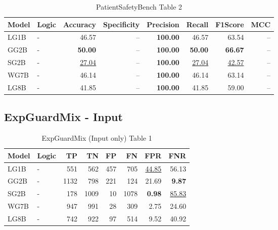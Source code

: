 \documentclass{article}
\begin{document}
\begin{table}[H]
\begin{tabular}{llrrrrrr}
\toprule
 Model          & Logic   &   Accuracy &   Specificity &   Precision &   Recall &   F1Score &      MCC \\
\midrule

 LG1B    & -       & 46.57             & --            & \textbf{100.00} & 46.57             & 63.54             & --    \\
 GG2B    & -       & \textbf{50.00}    & --            & \textbf{100.00} & \textbf{50.00}    & \textbf{66.67}    & --    \\
 SG2B    & -       & \underline{27.04} & --            & \textbf{100.00} & \underline{27.04} & \underline{42.57} & --    \\
 WG7B    & -       & 46.14             & --            & \textbf{100.00} & 46.14             & 63.14             & --    \\
 LG8B    & -       & 41.85             & --            & \textbf{100.00} & 41.85             & 59.00             & --    \\

\bottomrule
\end{tabular}
\caption{\label{tab:xstest2}PatientSafetyBench Table 2}
\end{table}

\subsection{ExpGuardMix - Input}

\begin{table}[H]
\centering
\begin{tabular}{llrrrrrr}
\toprule
 Model          & Logic   &   TP &   TN &   FP &   FN &   FPR &   FNR \\
\midrule

 LG1B    & -       &  551 &  562 &  457 &  705 & \underline{44.85} & 56.13             \\
 GG2B    & -       & 1132 &  798 &  221 &  124 & 21.69             & \textbf{9.87}     \\
 SG2B    & -       &  178 & 1009 &   10 & 1078 & \textbf{0.98}     & \underline{85.83} \\
 WG7B    & -       &  947 &  991 &   28 &  309 & 2.75              & 24.60             \\
 LG8B    & -       &  742 &  922 &   97 &  514 & 9.52              & 40.92             \\

\bottomrule
\end{tabular}
\caption{\label{tab:widgets}ExpGuardMix (Input only) Table 1}
\end{table}
\end{document}
